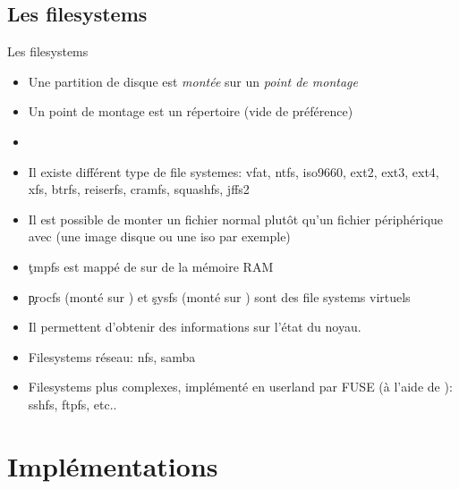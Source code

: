 \subsection{Les filesystems}

\begin{frame}[fragile=singleslide]{Les filesystems}
  \begin{itemize}
  \item Une  partition de disque est \emph{montée}  sur un \emph{point
      de montage}
  \item Un point de montage est un répertoire (vide de préférence)
  \item {}  
  \item  Il  existe  différent  type  de file  systemes:  vfat,  ntfs,
    iso9660, ext2, ext3, ext4, xfs, btrfs, reiserfs, cramfs, squashfs,
    jffs2
  \item  Il est  possible de  monter  un fichier  normal plutôt  qu'un
    fichier périphérique  avec  (une image  disque ou une
    iso par exemple)
  \item \c{tmpfs} est mappé de sur de la mémoire RAM
  \item \c{procfs}  (monté sur  ) et \c{sysfs}  (monté sur
    ) sont des file systems virtuels
  \item Il permettent d'obtenir des informations sur l'état du noyau.
  \item Filesystems réseau: nfs, samba
  \item Filesystems plus complexes, implémenté en userland par FUSE (à
    l'aide de ): sshfs, ftpfs, etc..
  \end{itemize}
\end{frame}

\section{Implémentations}

